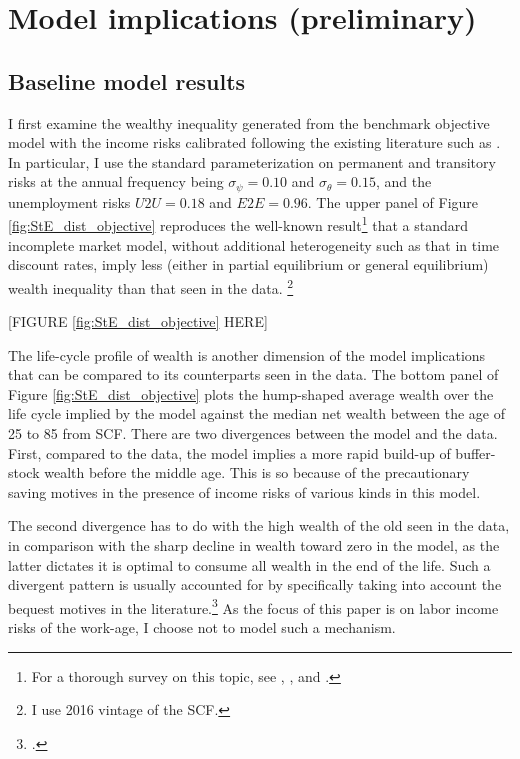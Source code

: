 \hypertarget{experiments}{%
\section{Model implications (preliminary)}\label{experiments}}

\subsection{Baseline model results}

I first examine the wealthy inequality generated from the benchmark objective model with the income risks calibrated following the existing literature such as \cite{krueger2016macroeconomics,carroll2017distribution}. In particular, I use the standard parameterization on permanent and transitory risks at the annual frequency being $\sigma_\psi=0.10$ and $\sigma_\theta =0.15$, and the unemployment risks $U2U=0.18$ and $E2E=0.96$. The upper panel of Figure \ref{fig:StE_dist_objective} reproduces the well-known result\footnote{For a thorough survey on this topic, see \cite{guvenen2011macroeconomics}, \cite{de2015quantitative}, and \cite{kaplan2018microeconomic}. } that a standard incomplete market model, without additional heterogeneity such as that in time discount rates, imply less (either in partial equilibrium or general equilibrium) wealth inequality than that seen in the data. \footnote{I use 2016 vintage of the SCF. }

\begin{center}
[FIGURE \ref{fig:StE_dist_objective} HERE]
\end{center}

The life-cycle profile of wealth is another dimension of the model implications that can be compared to its counterparts seen in the data. The bottom panel of Figure  \ref{fig:StE_dist_objective} plots the hump-shaped average wealth over the life cycle implied by the model against the median net wealth between the age of 25 to 85 from SCF. There are two divergences between the model and the data. First, compared to the data, the model implies a more rapid build-up of buffer-stock wealth before the middle age. This is so because of the precautionary saving motives in the presence of income risks of various kinds in this model. 

The second divergence has to do with the high wealth of the old seen in the data, in comparison with the sharp decline in wealth toward zero in the model, as the latter dictates it is optimal to consume all wealth in the end of the life. Such a divergent pattern is usually accounted for by specifically taking into account the bequest motives in the literature.\footnote{\cite{de2004wealth}.} As the focus of this paper is on labor income risks of the work-age, I choose not to model such a mechanism. 

